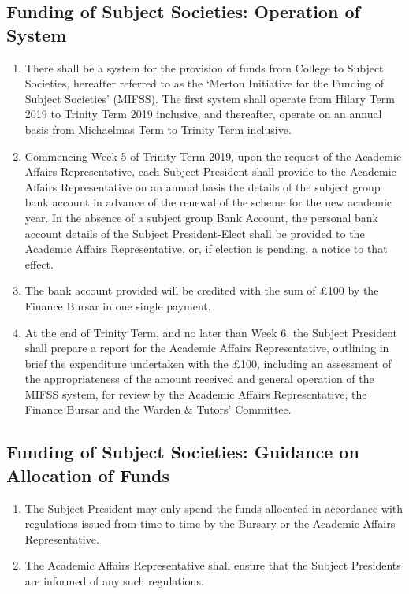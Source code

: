 \subsection{Funding of Subject Societies: Operation of System} \label{ssec:roles_subjpres_funding}
\begin{enumerate}
    \item There shall be a system for the provision of funds from College to Subject Societies, hereafter referred to as the `Merton Initiative for the Funding of Subject Societies' (MIFSS). The first system shall operate from Hilary Term 2019 to Trinity Term 2019 inclusive, and thereafter, operate on an annual basis from Michaelmas Term to Trinity Term inclusive.
    \item Commencing Week 5 of Trinity Term 2019, upon the request of the Academic Affairs Representative, each Subject President shall provide to the Academic Affairs Representative on an annual basis the details of the subject group bank account in advance of the renewal of the scheme for the new academic year. In the absence of a subject group Bank Account, the personal bank account details of the Subject President-Elect shall be provided to the Academic Affairs Representative, or, if election is pending, a notice to that effect.
    \item The bank account provided will be credited with the sum of £100 by the Finance Bursar in one single payment.
    \item At the end of Trinity Term, and no later than Week 6, the Subject President shall prepare a report for the Academic Affairs Representative, outlining in brief the expenditure undertaken with the £100, including an assessment of the appropriateness of the amount received and general operation of the MIFSS system, for review by the Academic Affairs Representative, the Finance Bursar and the Warden \& Tutors' Committee.
\end{enumerate}
\subsection{Funding of Subject Societies: Guidance on Allocation of Funds} \label{ssec:roles_subjpres_fundingguidance}
\begin{enumerate}
    \item The Subject President may only spend the funds allocated in accordance with regulations issued from time to time by the Bursary or the Academic Affairs Representative.
    \item The Academic Affairs Representative shall ensure that the Subject Presidents are informed of any such regulations.
\end{enumerate}
